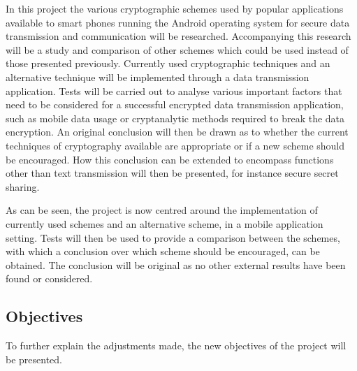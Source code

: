 \documentclass[a4paper,11pt]{article}
\begin{document}
In this project the various cryptographic schemes used by popular applications available to smart phones running the Android operating system for secure data transmission and communication will be researched. Accompanying this research will be a study and comparison of other schemes which could be used instead of those presented previously. Currently used cryptographic techniques and an alternative technique will be implemented through a data transmission application. Tests will be carried out to analyse various important factors that need to be considered for a successful encrypted data transmission application, such as mobile data usage or cryptanalytic methods required to break the data encryption. An original conclusion will then be drawn as to whether the current techniques of cryptography available are appropriate or if a new scheme should be encouraged. How this conclusion can be extended to encompass functions other than text transmission will then be presented, for instance secure secret sharing.

As can be seen, the project is now centred around the implementation of currently used schemes and an alternative scheme, in a mobile application setting. Tests will then be used to provide a comparison between the schemes, with which a conclusion over which scheme should be encouraged, can be obtained. The conclusion will be original as no other external results have been found or considered.
 
\subsection{Objectives}

To further explain the adjustments made, the new objectives of the project will be presented.
\end{document}
